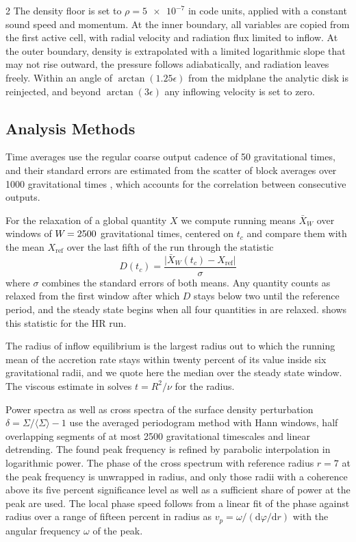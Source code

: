 \begin{multicols}{2}
	The density floor is set to $\rho = \num{5e-7}$ in code units, applied with a constant sound speed and momentum. At the inner
	boundary, all variables are copied from the first active cell, with radial velocity and radiation flux limited to inflow. At
	the outer boundary, density is extrapolated with a limited logarithmic slope that may not rise outward, the pressure follows
	adiabatically, and radiation leaves freely. Within an angle of $\arctan(1.25 \epsilon)$ from the midplane the analytic disk
	is reinjected, and beyond $\arctan(3 \epsilon)$ any inflowing velocity is set to zero.

	\subsection{Analysis Methods}
	\label{app:methods}

	Time averages use the regular coarse output cadence of \num{50} gravitational times, and their standard errors are estimated from
	the scatter of block averages over \num{1000} gravitational times \cite{flyv1989}, which accounts for the correlation between
	consecutive outputs.

	For the relaxation of a global quantity $X$ we compute running means $\bar X_W$ over windows of $W\kern-1pt = 2500$ gravitational
	times, centered on $t_c$ and compare them with the mean $X_\mathrm{ref}$ over the last fifth of the run through the statistic
	\begin{equation}
		D(t_c) = \frac{\lvert \bar X_W(t_c) - X_\mathrm{ref} \rvert}{\sigma}
	\end{equation}
	where $\sigma$ combines the standard errors of both means. Any quantity counts as relaxed from the first window after which
	$D$ stays below two until the reference period, and the steady state begins when all four quantities in 
	are relaxed.  shows this statistic for the HR run.

	The radius of inflow equilibrium is the largest radius out to which the running mean of the accretion rate stays within
	twenty percent of its value inside six gravitational radii, and we quote here the median over the steady state window. The viscous
	estimate in  solves $t = R^2 / \nu$ for the radius.

	Power spectra as well as cross spectra of the surface density perturbation $\delta = \Sigma / \langle \Sigma \rangle - 1$ use the
	averaged periodogram method \cite{welc1967} with Hann windows, half overlapping segments of at most \num{2500} gravitational timescales and linear
	detrending. The found peak frequency is refined by parabolic interpolation in logarithmic power. The phase of the cross spectrum
	with reference radius $r = 7$ at the peak frequency is unwrapped in radius, and only those radii with a coherence above its five
	percent significance level as well as a sufficient share of power at the peak are used. The local phase speed follows from a linear
	fit of the phase against radius over a range of fifteen percent in radius as
	$v_p = \omega / (\mathrm{d}\varphi / \mathrm{d}r)$ with the angular frequency $\omega$ of the peak.


\end{multicols}

